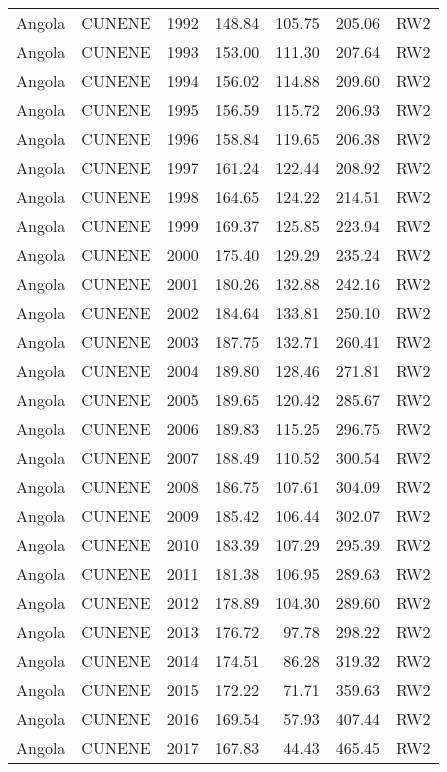 \begin{longtable}{lllrrrl}
  Angola & CUNENE & 1992 & 148.84 & 105.75 & 205.06 & RW2 \\ 
  Angola & CUNENE & 1993 & 153.00 & 111.30 & 207.64 & RW2 \\ 
  Angola & CUNENE & 1994 & 156.02 & 114.88 & 209.60 & RW2 \\ 
  Angola & CUNENE & 1995 & 156.59 & 115.72 & 206.93 & RW2 \\ 
  Angola & CUNENE & 1996 & 158.84 & 119.65 & 206.38 & RW2 \\ 
  Angola & CUNENE & 1997 & 161.24 & 122.44 & 208.92 & RW2 \\ 
  Angola & CUNENE & 1998 & 164.65 & 124.22 & 214.51 & RW2 \\ 
  Angola & CUNENE & 1999 & 169.37 & 125.85 & 223.94 & RW2 \\ 
  Angola & CUNENE & 2000 & 175.40 & 129.29 & 235.24 & RW2 \\ 
  Angola & CUNENE & 2001 & 180.26 & 132.88 & 242.16 & RW2 \\ 
  Angola & CUNENE & 2002 & 184.64 & 133.81 & 250.10 & RW2 \\ 
  Angola & CUNENE & 2003 & 187.75 & 132.71 & 260.41 & RW2 \\ 
  Angola & CUNENE & 2004 & 189.80 & 128.46 & 271.81 & RW2 \\ 
  Angola & CUNENE & 2005 & 189.65 & 120.42 & 285.67 & RW2 \\ 
  Angola & CUNENE & 2006 & 189.83 & 115.25 & 296.75 & RW2 \\ 
  Angola & CUNENE & 2007 & 188.49 & 110.52 & 300.54 & RW2 \\ 
  Angola & CUNENE & 2008 & 186.75 & 107.61 & 304.09 & RW2 \\ 
  Angola & CUNENE & 2009 & 185.42 & 106.44 & 302.07 & RW2 \\ 
  Angola & CUNENE & 2010 & 183.39 & 107.29 & 295.39 & RW2 \\ 
  Angola & CUNENE & 2011 & 181.38 & 106.95 & 289.63 & RW2 \\ 
  Angola & CUNENE & 2012 & 178.89 & 104.30 & 289.60 & RW2 \\ 
  Angola & CUNENE & 2013 & 176.72 & 97.78 & 298.22 & RW2 \\ 
  Angola & CUNENE & 2014 & 174.51 & 86.28 & 319.32 & RW2 \\ 
  Angola & CUNENE & 2015 & 172.22 & 71.71 & 359.63 & RW2 \\ 
  Angola & CUNENE & 2016 & 169.54 & 57.93 & 407.44 & RW2 \\ 
  Angola & CUNENE & 2017 & 167.83 & 44.43 & 465.45 & RW2 \\ 

\end{longtable}
